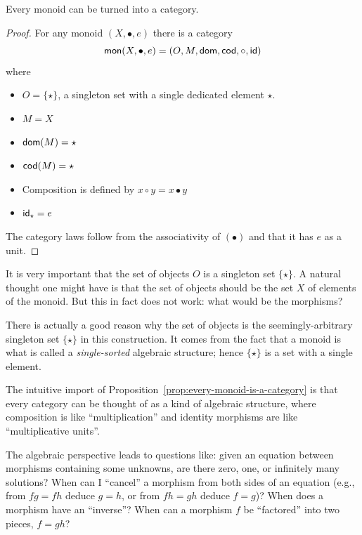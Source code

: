 \begin{construction} \label{prop:every-monoid-is-a-category}
  Every monoid can be turned into a category.
\end{construction}
\begin{proof}
  For any monoid \((X,\bullet,e)\) there is a category
  \[
    \mathsf{mon}(X,\bullet,e) = (O,M,\operatorname{\mathsf{dom}},\operatorname{\mathsf{cod}},\circ,\mathsf{id})
  \]
  where
  \begin{itemize}
  \item \(O = \{\star\}\), a singleton set with a single dedicated element \(\star\).
  \item \(M = X\)
  \item \(\operatorname{\mathsf{dom}}(M) = \star\)
  \item \(\operatorname{\mathsf{cod}}(M) = \star\)
  \item Composition is defined by \(x \circ y = x \bullet y\)
  \item \(\mathsf{id}_\star = e\)
  \end{itemize}
  The category laws follow from the associativity of \((\bullet)\)
  and that it has \(e\) as a unit.
\end{proof}
\begin{note}
  It is very important that the set of objects \(O\) is a singleton set \(\{\star\}\).
  A natural thought one might have is that the set of objects should be the set \(X\) of elements of the monoid.
  But this in fact does not work: what would be the morphisms?

  There is actually a good reason why the set of objects is the seemingly-arbitrary singleton set \(\{\star\}\) in this construction.
  It comes from the fact that a monoid is what is called a \emph{single-sorted} algebraic structure; hence \(\{\star\}\)
  is a set with a single element.
\end{note}
The intuitive import of
Proposition~\ref{prop:every-monoid-is-a-category} is that
every category can be thought of as a kind of algebraic structure,
where composition is like ``multiplication''
and identity morphisms are like ``multiplicative units''.

The algebraic perspective leads to questions like:
given an equation between morphisms containing some unknowns,
are there zero, one, or infinitely many solutions?
When can I ``cancel'' a morphism from both sides of an equation (e.g., from \(fg = fh\) deduce \(g=h\),
or from \(fh = gh\) deduce \(f=g\))?
When does a morphism have an ``inverse''?
When can a morphism \(f\) be ``factored'' into two pieces, \(f = gh\)?


